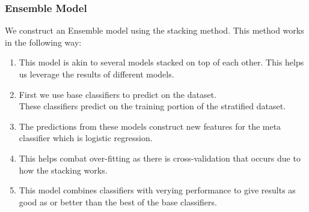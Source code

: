 \subsubsection{Ensemble Model}
We construct an Ensemble model using the stacking method. This method works in the following way:

\begin{enumerate}
    \item This model is akin to several models stacked on top of each other. This helps us leverage the results of different models.
    \item First we use base classifiers to predict on the dataset.\\
    These classifiers predict on the training portion of the stratified dataset.\\
    \item The predictions from these models construct new features for the meta classifier which is logistic regression.
    \item This helps combat over-fitting as there is cross-validation that occurs due to how the stacking works.
    \item This model combines classifiers with verying performance to give results as good as or better than the best of the base classifiers.
\end{enumerate}


